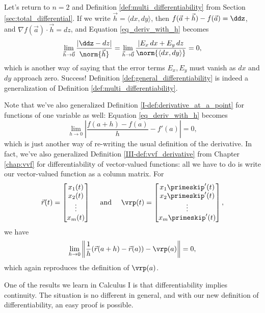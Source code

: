 Let's return to $n=2$ and Definition \ref{def:multi_differentiability} from Section \ref{sec:total_differential}. If we write $\vec{h} = \langle dx, dy\rangle$, then $f(\vec{a}+\vec{h})-f(\vec{a}) = \ddz$, and $\nabla f(\vec{a})\cdot \vec{h} = dz$, and Equation \eqref{eq_deriv_with_h} becomes
\[
\lim_{\vec{h}\to\vec{0}}\frac{\lvert \ddz-dz\rvert}{\norm{\vec{h}}} = \lim_{\vec{h}\to\vec{0}}\frac{\lvert E_x\,dx+E_y\,dz}{\norm{\langle dx,dy\rangle}} = 0,
\]
which is another way of saying that the error terms $E_x,E_y$ must vanish as $dx$ and $dy$ approach zero. Success! Definition \ref{def:general_differentiability} is indeed a generalization of Definition \ref{def:multi_differentiability}.

Note that we've also generalized Definition \ref{I-def:derivative_at_a_point} for functions of one variable as well: Equation \eqref{eq_deriv_with_h} becomes
\[
\lim_{h\to 0}\left\lvert \frac{f(a+h)-f(a)}{h}-f'(a)\right\rvert = 0,
\]
which is just another way of re-writing the usual definition of the derivative. In fact, we've also generalized Definition \ref{III-def:vvf_derivative} from Chapter \ref{chap:vvf} for differentiability of vector-valued functions: all we have to do is write our vector-valued function as a column matrix. For
\[
\vec{r}(t) = \begin{bmatrix}x_1(t)\\x_2(t)\\\vdots \\x_m(t)\end{bmatrix} \quad \text{ and } \quad \vrp(t) = \begin{bmatrix}x_1\primeskip'(t)\\x_2\primeskip'(t)\\\vdots \\x_m\primeskip'(t)\end{bmatrix},
\]
we have
\[
\lim_{h\to 0}\left\lVert \frac{1}{h}(\vec{r}(a+h)-\vec{r}(a))- \vrp(a)\right\rVert = 0,
\]
which again reproduces the definition of $\vrp(a)$.

One of the results we learn in Calculus I is that differentiability implies continuity. The situation is no different in general, and with our new definition of differentiability, an easy proof is possible.

\\

